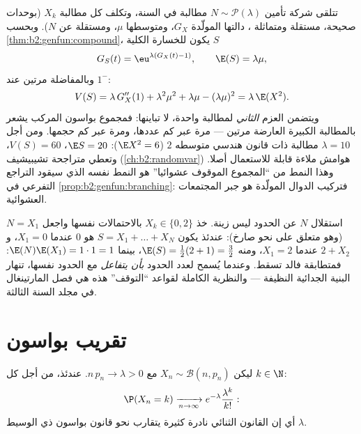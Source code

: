 \begin{example}\label{ex:b2:genfun:compoundpoisson}
تتلقى شركة تأمين $N \sim \mathcal P(\lambda)$ مطالبة في السنة، وتكلف كل مطالبة $X_k$
(بوحدات صحيحة، مستقلة ومتماثلة ، دالتها المولّدة $G_X$،
ومتوسطها $\mu$، ومستقلة عن $N$). وبحسب \cref{thm:b2:genfun:compound}، يكون للخسارة
الكلية $S$
\[
G_S(t) = \eu^{\lambda(G_X(t) - 1)},
\qquad
\E(S) = \lambda\mu ,
\]
وبالمفاضلة مرتين عند $1^-$:
\[
V(S) = \lambda\,G_X''(1) + \lambda^2\mu^2 + \lambda\mu -
(\lambda\mu)^2 = \lambda\,\E(X^2) .
\]
ويتضمن  العزم \emph{الثاني} لمطالبة واحدة، لا تباينها: فمجموع
بواسون المركب يشعر بالمطالبة الكبيرة العارضة مرتين --- مرة عبر كم
عددها، ومرة عبر كم حجمها. ومن أجل $\lambda = 10$ مطالبة ذات قانون هندسي
متوسطه $2$ ($\E X^2 = 6$): $\E S = 20$، $V(S) = 60$، وتعطي متراجحة تشيبيشيف
(\cref{ch:b2:randomvar}) هوامش ملاءة قابلة للاستعمال أصلا. وهذا النمط من ``المجموع
الموقوف عشوائيا'' هو النمط نفسه الذي سيقود التراجع التفرعي في
\cref{prop:b2:genfun:branching}: فتركيب الدوال المولّدة هو جبر المجتمعات العشوائية.
\end{example}

\begin{remark}
استقلال $N$ عن الحدود ليس زينة. خذ $X_k \in \{0, 2\}$ بالاحتمالات نفسها
واجعل $N =
X_1$ (وهو متعلق على نحو صارخ): عندئذ يكون $S = X_1 + \dots + X_N$ هو $0$
عندما $X_1 = 0$، و$2 + X_2$ عندما $X_1 = 2$، ومنه $\E(S) =
\frac12(2 + 1) = \frac32$، بينما $\E(N)\E(X_1) = 1\cdot1 =
1$:
فمتطابقة فالد تسقط. وعندما يُسمح لعدد الحدود \emph{بأن يتفاعل} مع
الحدود نفسها، تنهار البنية الجدائية النظيفة --- والنظرية الكاملة
لقواعد ``التوقف'' هذه هي فصل المارتينغال في مجلد السنة الثالثة.
\end{remark}

\section{تقريب بواسون}

\begin{theorem}\label{thm:b2:genfun:rareevents}
ليكن $X_n \sim \mathcal{B}(n, p_n)$ مع $n\,p_n \to \lambda > 0$. عندئذ، من أجل كل $k \in \N$:
\[
\P(X_n = k)
\xrightarrow[n\to\infty]{}
e^{-\lambda}\frac{\lambda^k}{k!} :
\]
أي إن القانون الثنائي  نادرة كثيرة يتقارب نحو قانون
بواسون ذي الوسيط $\lambda$.
\end{theorem}

